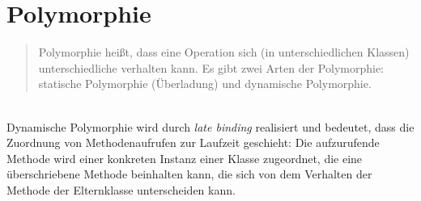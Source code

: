 \section{Polymorphie}

\begin{tcolorbox}[title=Polymorphie-Prinzip]
    \blockquote[{\cite[67]{Oes05}}]{
        Polymorphie heißt, dass eine Operation sich (in unterschiedlichen Klassen) unterschiedliche verhalten kann. Es gibt zwei Arten der Polymorphie: statische Polymorphie (Überladung) und dynamische Polymorphie.
    }\\
    \noindent
    Dynamische Polymorphie wird durch \textit{late binding} realisiert und bedeutet, dass die Zuordnung von Methodenaufrufen zur Laufzeit geschieht: Die aufzurufende Methode wird einer konkreten Instanz einer Klasse zugeordnet,
    die eine überschriebene Methode beinhalten kann, die sich von dem Verhalten der Methode der Elternklasse unterscheiden kann.
\end{tcolorbox}